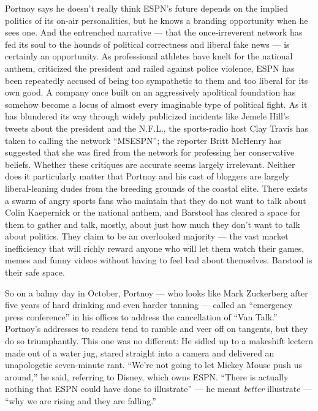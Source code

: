 Portnoy says he doesn't really think ESPN's future depends on the
implied politics of its on-air personalities, but he knows a branding
opportunity when he sees one. And the entrenched narrative --- that the
once-irreverent network has fed its soul to the hounds of political
correctness and liberal fake news --- is certainly an opportunity. As
professional athletes have knelt for the national anthem, criticized the
president and railed against police violence, ESPN has been repeatedly
accused of being too sympathetic to them and too liberal for its own
good. A company once built on an aggressively apolitical foundation has
somehow become a locus of almost every imaginable type of political
fight. As it has blundered its way through widely publicized incidents
like Jemele Hill's tweets about the president and the N.F.L., the
sports-radio host Clay Travis has taken to calling the network
``MSESPN''; the reporter Britt McHenry has suggested that she was fired
from the network for professing her conservative beliefs. Whether these
critiques are accurate seems largely irrelevant. Neither does it
particularly matter that Portnoy and his cast of bloggers are largely
liberal-leaning dudes from the breeding grounds of the coastal elite.
There exists a swarm of angry sports fans who maintain that they do not
want to talk about Colin Kaepernick or the national anthem, and Barstool
has cleared a space for them to gather and talk, mostly, about just how
much they don't want to talk about politics. They claim to be an
overlooked majority --- the vast market inefficiency that will richly
reward anyone who will let them watch their games, memes and funny
videos without having to feel bad about themselves. Barstool is their
safe space.

So on a balmy day in October, Portnoy --- who looks like Mark Zuckerberg
after five years of hard drinking and even harder tanning --- called an
``emergency press conference'' in his offices to address the
cancellation of ``Van Talk.'' Portnoy's addresses to readers tend to
ramble and veer off on tangents, but they do so triumphantly. This one
was no different: He sidled up to a makeshift lectern made out of a
water jug, stared straight into a camera and delivered an unapologetic
seven-minute rant. ``We're not going to let Mickey Mouse push us
around,'' he said, referring to Disney, which owns ESPN. ``There is
actually nothing that ESPN could have done to illustrate'' --- he meant
\emph{better} illustrate --- ``why we are rising and they are falling.''

